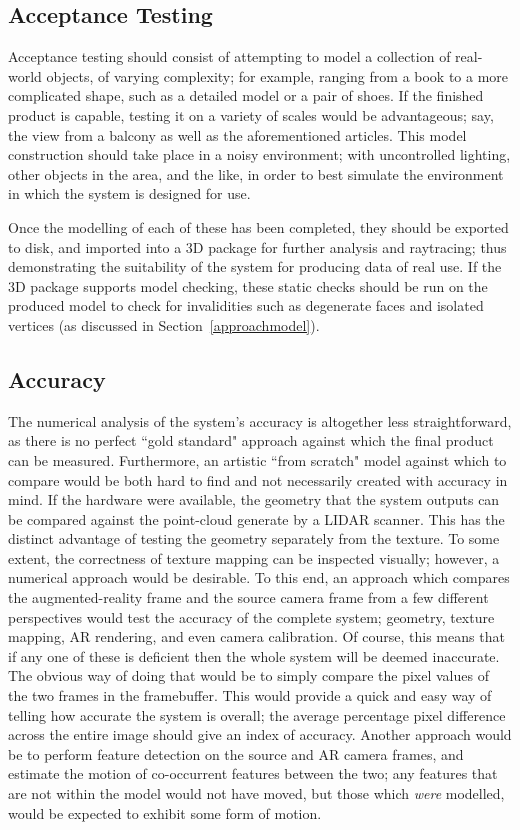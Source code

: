 \documentclass[a4paper,10pt]{article}
\begin{document}
\subsection{Acceptance Testing}
Acceptance testing should consist of attempting to model a collection of real-world objects, of varying complexity; for example, ranging from a book to a more complicated shape, such as a detailed model or a pair of shoes. If the finished product is capable, testing it on a variety of scales would be advantageous; say, the view from a balcony as well as the aforementioned articles. This model construction should take place in a noisy environment; with uncontrolled lighting, other objects in the area, and the like, in order to best simulate the environment in which the system is designed for use. 

Once the modelling of each of these has been completed, they should be exported to disk, and imported into a 3D package for further analysis and raytracing; thus demonstrating the suitability of the system for producing data of real use. If the 3D package supports model checking, these static checks should be run on the produced model to check for invalidities such as degenerate faces and isolated vertices (as discussed in Section~\ref{approachmodel}).
\pagebreak

\subsection{Accuracy}
The numerical analysis of the system's accuracy is altogether less straightforward, as there is no perfect ``gold standard" approach against which the final product can be measured. Furthermore, an artistic ``from scratch" model against which to compare would be both hard to find and not necessarily created with accuracy in mind. If the hardware were available, the geometry that the system outputs can be compared against the point-cloud generate by a LIDAR scanner. This has the distinct advantage of testing the geometry separately from the texture. To some extent, the correctness of texture mapping can be inspected visually; however, a numerical approach would be desirable. To this end, an approach which compares the augmented-reality frame and the source camera frame from a few different perspectives would test the accuracy of the complete system; geometry, texture mapping, AR rendering, and even camera calibration. Of course, this means that if any one of these is deficient then the whole system will be deemed inaccurate. The obvious way of doing that would be to simply compare the pixel values of the two frames in the framebuffer. This would provide a quick and easy way of telling how accurate the system is overall; the average percentage pixel difference across the entire image should give an index of accuracy. Another approach would be to perform feature detection on the source and AR camera frames, and estimate the motion of co-occurrent features between the two; any features that are not within the model would not have moved, but those which \textit{were} modelled, would be expected to exhibit some form of motion. 
\end{document}
